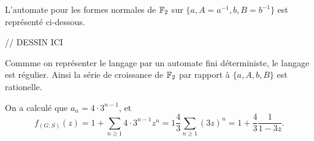   
  
  \begin{ex}
    L'automate pour les formes normales de $\mathbb{F}_2$ sur $\{a, A = a^{-1}, b, B = b^{-1}\}$ est représenté ci-dessous.

    // DESSIN ICI
    
    Commme on représenter le langage par un automate fini déterministe, le langage est régulier. Ainsi la
    série de croissance de $\mathbb{F}_2$ par rapport à $\{a, A, b, B\}$ est rationelle.

    On a calculé que $a_n = 4 \cdot 3^{n-1}$, et
      \[f_{(G, S)}(z) = 1 + \sum_{n \geq 1} 4\cdot 3^{n-1}z^n = 1 \frac{4}{3} \sum_{n \geq 1}(3z)^n = 1 +
      \frac{4}{3} \frac{1}{1-3z}.\]
  \end{ex}

  

  







